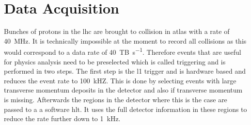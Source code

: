 \section{Data Acquisition}
Bunches of protons in the \ac{lhc} are brought to collision in \ac{atlas} with a rate of \qty[]{40}{MHz}. It is technically impossible at the moment to record all collisions as this would correspond to a data rate of \qty[]{40}{TB\per s}. Therefore events that are useful for physics analysis need to be preselected which is called triggering and is performed in two steps. The first step is the \ac{l1} trigger and is hardware based and reduces the event rate to \qty[]{100}{kHZ}. This is done by selecting events with large transverse momentum deposits in the detector and also if transverse momentum is missing. Afterwards the regions in the detector where this is the case are passed to a a software \ac{hlt}. It uses the full detector information in these regions to reduce the rate further down to \qty[]{1}{kHz}.
